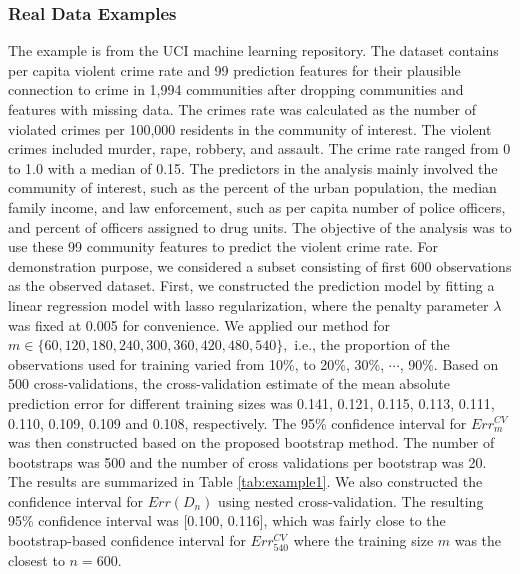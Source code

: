 \documentclass[12pt]{article}
\begin{document}
\subsubsection{Real Data Examples}

The example is from the UCI machine learning repository.  The dataset contains per capita violent crime rate and 99 prediction features for their plausible connection to crime in 1,994 communities after dropping communities and features with missing data.  The crimes rate was calculated as the number of violated crimes per 100,000 residents in the community of interest. The violent crimes included murder, rape, robbery, and assault.  The crime rate ranged from 0 to 1.0 with a median of 0.15. The predictors in the analysis mainly involved the community of interest, such as the percent of the urban population, the median family income, and law enforcement, such as per capita number of police officers, and percent of officers assigned to drug units. The objective of the analysis was to use these 99 community features to predict the violent crime rate.  For demonstration purpose, we considered a subset consisting of first 600 observations as the observed dataset.  First, we constructed the prediction model by fitting a linear regression model with lasso regularization, where the penalty parameter $\lambda$ was fixed at 0.005 for convenience. We applied our method for $m\in \{60, 120, 180, 240, 300, 360, 420, 480, 540\},$ i.e., the proportion of the observations used for training varied from 10\%, to 20\%, 30\%, $\cdots$, 90\%.  Based on 500 cross-validations, the cross-validation estimate of the mean absolute prediction error for different training sizes was 0.141, 0.121, 0.115, 0.113, 0.111, 0.110, 0.109, 0.109 and 0.108, respectively.  The 95\% confidence interval for $Err_m^{CV}$ was then constructed based on the proposed bootstrap method. The number of bootstraps was 500 and the number of cross validations per bootstrap was 20.  The results are summarized in Table \ref{tab:example1}.  We also constructed the confidence interval for $Err(D_n)$ using nested cross-validation.  The resulting 95\% confidence interval was [0.100, 0.116], which was fairly close to the bootstrap-based confidence interval for $Err_{540}^{CV}$ where the training size $m$ was the closest to $n=600.$ 
\end{document}
